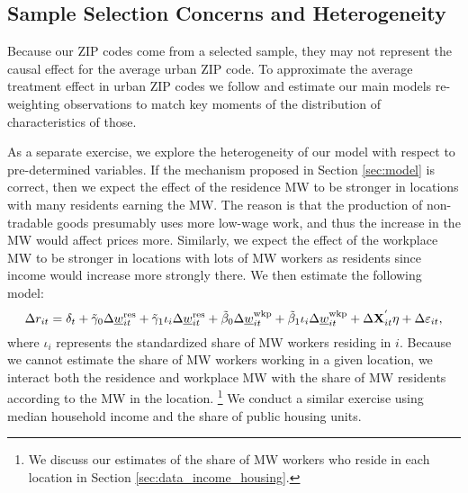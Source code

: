 \subsection{Sample Selection Concerns and Heterogeneity}\label{sec:emp_start_heterogeneity}

Because our ZIP codes come from a selected sample, they may not represent
the causal effect for the average urban ZIP code.
To approximate the average treatment effect in urban ZIP codes we follow
\textcite{Hainmueller2012} and estimate our main models re-weighting 
observations to match key moments of the distribution of characteristics of 
those.

As a separate exercise, we explore the heterogeneity of our model with respect
to pre-determined variables.
If the mechanism proposed in Section \ref{sec:model} is correct, then we
expect the effect of the residence MW to be stronger in locations with many 
residents earning the MW.
The reason is that the production of non-tradable goods presumably uses more
low-wage work, and thus the increase in the MW would affect prices more.
Similarly, we expect the effect of the workplace MW to be stronger in locations
with lots of MW workers as residents since income would increase more 
strongly there.
We then estimate the following model:
\begin{equation}\label{eq:fd_heterogeneity}
    \Delta r_{it} = \delta_t
                  + \tilde\gamma_0 \Delta \underline{w}^{\text{res}}_{it}
                  + \tilde\gamma_1 \iota_i \Delta \underline{w}^{\text{res}}_{it}
                  + \tilde\beta_0 \Delta \underline{w}^{\text{wkp}}_{it}
                  + \tilde\beta_1 \iota_i \Delta \underline{w}^{\text{wkp}}_{it}
                  + \Delta \mathbf{X}^{'}_{it}\eta
                  + \Delta \varepsilon_{it} ,
\end{equation}
where $\iota_i$ represents the standardized share of MW workers residing in $i$.
Because we cannot estimate the share of MW workers working in a given location,
we interact both the residence and workplace MW with the share of MW residents
according to the MW in the location.%
\footnote{We discuss our estimates of the share of MW workers who reside in each 
location in Section \ref{sec:data_income_housing}.}
We conduct a similar exercise using median household income and the share of 
public housing units.
